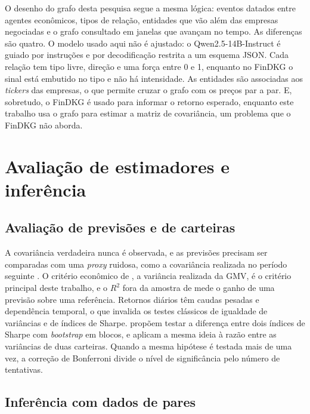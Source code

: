 O desenho do grafo desta pesquisa segue a mesma lógica: eventos datados entre agentes econômicos, tipos de
relação, entidades que vão além das empresas negociadas e o grafo consultado em janelas que avançam no
tempo. As diferenças são quatro. O modelo usado aqui não é ajustado: o Qwen2.5-14B-Instruct
\citep{qwen2024} é guiado por instruções e por decodificação restrita a um esquema JSON. Cada relação tem
tipo livre, direção e uma força entre 0 e 1, enquanto no FinDKG o sinal está embutido no tipo e não há
intensidade. As entidades são associadas aos \emph{tickers} das empresas, o que permite cruzar o grafo com
os preços par a par. E, sobretudo, o FinDKG é usado para informar o retorno esperado, enquanto este trabalho
usa o grafo para estimar a matriz de covariância, um problema que o FinDKG não aborda.

\section{Avaliação de estimadores e inferência}
\label{sec:inferencia}

\subsection{Avaliação de previsões e de carteiras}

A covariância verdadeira nunca é observada, e as previsões precisam ser comparadas com uma \emph{proxy}
ruidosa, como a covariância realizada no período seguinte \citep{patton2011}. O critério econômico de
\citet{engle2006}, a variância realizada da GMV, é o critério principal deste trabalho, e o $R^2$ fora da
amostra de \citet{campbell2008} mede o ganho de uma previsão sobre uma referência. Retornos diários têm
caudas pesadas e dependência temporal, o que invalida os testes clássicos de igualdade de variâncias e de
índices de Sharpe. \citet{ledoit2008} propõem testar a diferença entre dois índices de Sharpe com
\emph{bootstrap} em blocos, e \citet{ledoit2011} aplicam a mesma ideia à razão entre as variâncias de duas
carteiras. Quando a mesma hipótese é testada mais de uma vez, a correção de Bonferroni divide o nível de
significância pelo número de tentativas.

\subsection{Inferência com dados de pares}

